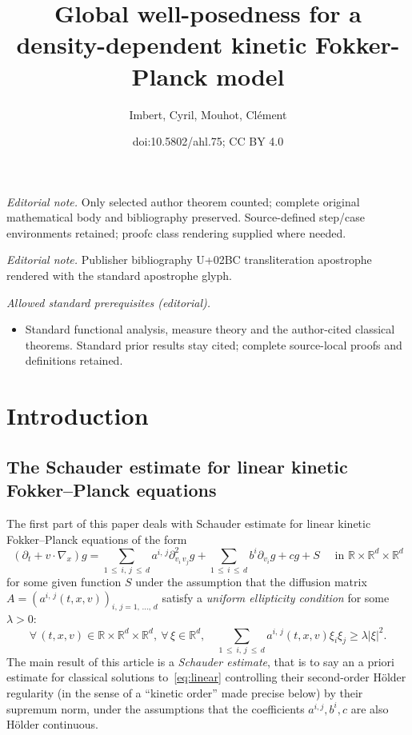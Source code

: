 \documentclass[10pt]{amsart}
\title{Global well-posedness for a density-dependent kinetic Fokker-Planck model}
\author{Imbert, Cyril, Mouhot, Clément}
\date{doi:10.5802/ahl.75; CC BY 4.0}
\theoremstyle{definition}\newtheorem{defi}[theo]{Definition}\newtheorem{rema}[theo]{Remark}\newtheorem{exam}[theo]{Example}\newtheorem{exem}[theo]{Example}\newtheorem{nota}[theo]{Notation}
\newcommand{\R}{\mathbb{R}}
\let\oldforall\forall
\renewcommand*{\forall}{\mathrel{\oldforall}}
\begin{document}
\maketitle
\noindent\textit{Editorial note.} Only selected author theorem counted; complete original mathematical body and bibliography preserved. Source-defined step/case environments retained; proofc class rendering supplied where needed.\par\medskip
\noindent\textit{Editorial note.} Publisher bibliography U+02BC transliteration apostrophe rendered with the standard apostrophe glyph.\par\medskip
\noindent\textit{Allowed standard prerequisites (editorial).}\begin{itemize}
\item Standard functional analysis, measure theory and the author-cited classical theorems. Standard prior results stay cited; complete source-local proofs and definitions retained.
\end{itemize}\medskip

\section{Introduction}

\subsection{The Schauder estimate for linear kinetic Fokker--Planck equations}

The first part of this paper deals with Schauder estimate for linear kinetic Fokker--Planck equations of the form
\begin{equation}\label{eq:linear}
\left(\partial_t + v \cdot \nabla_x\right) g =
\sum_{1\,\le\:i,\,j\:\le\,d} a^{i,\,j} \partial^2_{v_i\,v_j} g + \sum_{1\,\le\,i\,\le\,d}b^i \partial_{v_i} g + c g + S \quad \text{ in } \R \times \R^d \times \R^d
\end{equation}
for some given function $S$ under the assumption that the diffusion matrix\linebreak$A= (a^{i,\,j}(t,x,v))_{i,\,j=1,\,\dots,\,d}$ satisfy a \emph{uniform ellipticity condition} for some $\lambda>0$:
\begin{equation}\label{eq:elliptic}
\forall \, (t,x,v) \in \R \times \R^d \times \R^d, \
\forall \, \xi \in \R^d, \quad
\sum_{1\,\le\:i,\,j\:\le\,d} a^{i,\,j}(t,x,v) \xi_i \xi_j \ge \lambda |\xi|^2.
\end{equation}
The main result of this article is a \emph{Schauder estimate}, that is to say an a priori estimate for classical solutions to~\eqref{eq:linear} controlling their second-order H\"older regularity (in the sense of a ``kinetic order'' made precise below) by their supremum norm, under the assumptions that the coefficients $a^{i,j},b^i,c$ are also H\"older continuous.
\end{document}
